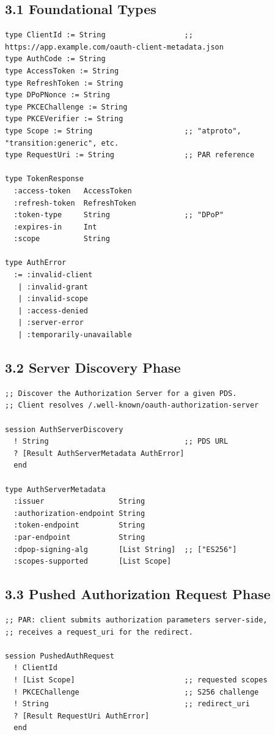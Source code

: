 \documentclass[11pt]{article}
\begin{document}
\subsection{3.1 Foundational Types}
\label{sec:orge6ec34c}

\begin{verbatim}
type ClientId := String                  ;; https://app.example.com/oauth-client-metadata.json
type AuthCode := String
type AccessToken := String
type RefreshToken := String
type DPoPNonce := String
type PKCEChallenge := String
type PKCEVerifier := String
type Scope := String                     ;; "atproto", "transition:generic", etc.
type RequestUri := String                ;; PAR reference

type TokenResponse
  :access-token   AccessToken
  :refresh-token  RefreshToken
  :token-type     String                 ;; "DPoP"
  :expires-in     Int
  :scope          String

type AuthError
  := :invalid-client
   | :invalid-grant
   | :invalid-scope
   | :access-denied
   | :server-error
   | :temporarily-unavailable
\end{verbatim}
\subsection{3.2 Server Discovery Phase}
\label{sec:org8e6b04a}

\begin{verbatim}
;; Discover the Authorization Server for a given PDS.
;; Client resolves /.well-known/oauth-authorization-server

session AuthServerDiscovery
  ! String                               ;; PDS URL
  ? [Result AuthServerMetadata AuthError]
  end

type AuthServerMetadata
  :issuer                 String
  :authorization-endpoint String
  :token-endpoint         String
  :par-endpoint           String
  :dpop-signing-alg       [List String]  ;; ["ES256"]
  :scopes-supported       [List Scope]
\end{verbatim}
\subsection{3.3 Pushed Authorization Request Phase}
\label{sec:orgc2b892e}

\begin{verbatim}
;; PAR: client submits authorization parameters server-side,
;; receives a request_uri for the redirect.

session PushedAuthRequest
  ! ClientId
  ! [List Scope]                         ;; requested scopes
  ! PKCEChallenge                        ;; S256 challenge
  ! String                               ;; redirect_uri
  ? [Result RequestUri AuthError]
  end
\end{verbatim}
\end{document}
